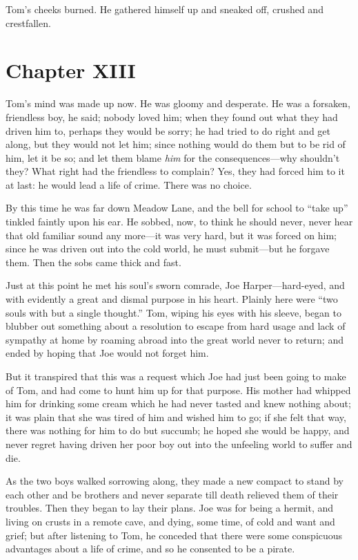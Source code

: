 \documentclass{book}
\begin{document}
Tom’s cheeks burned. He gathered himself up and sneaked off, crushed and crestfallen.

\chapter*{Chapter XIII}

Tom’s mind was made up now. He was gloomy and desperate. He was a forsaken, friendless boy, he said; nobody loved him; when they found out what they had driven him to, perhaps they would be sorry; he had tried to do right and get along, but they would not let him; since nothing would do them but to be rid of him, let it be so; and let them blame \emph{him} for the consequences—why shouldn’t they? What right had the friendless to complain? Yes, they had forced him to it at last: he would lead a life of crime. There was no choice.

By this time he was far down Meadow Lane, and the bell for school to “take up” tinkled faintly upon his ear. He sobbed, now, to think he should never, never hear that old familiar sound any more—it was very hard, but it was forced on him; since he was driven out into the cold world, he must submit—but he forgave them. Then the sobs came thick and fast.

Just at this point he met his soul’s sworn comrade, Joe Harper—hard-eyed, and with evidently a great and dismal purpose in his heart. Plainly here were “two souls with but a single thought.” Tom, wiping his eyes with his sleeve, began to blubber out something about a resolution to escape from hard usage and lack of sympathy at home by roaming abroad into the great world never to return; and ended by hoping that Joe would not forget him.

But it transpired that this was a request which Joe had just been going to make of Tom, and had come to hunt him up for that purpose. His mother had whipped him for drinking some cream which he had never tasted and knew nothing about; it was plain that she was tired of him and wished him to go; if she felt that way, there was nothing for him to do but succumb; he hoped she would be happy, and never regret having driven her poor boy out into the unfeeling world to suffer and die.

As the two boys walked sorrowing along, they made a new compact to stand by each other and be brothers and never separate till death relieved them of their troubles. Then they began to lay their plans. Joe was for being a hermit, and living on crusts in a remote cave, and dying, some time, of cold and want and grief; but after listening to Tom, he conceded that there were some conspicuous advantages about a life of crime, and so he consented to be a pirate.
\end{document}
